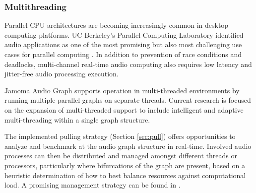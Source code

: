 \documentclass[twoside,a4paper]{article}
\begin{document}
%


\subsubsection{Multithreading} %

Parallel CPU architectures are becoming increasingly common in desktop computing platforms.
UC Berkeley's Parallel Computing Laboratory identified audio applications as one of the most promising but also most challenging use cases for parallel computing \cite{asanovic2008parallel}. 
In addition to prevention of race conditions and deadlocks, multi-channel real-time audio computing also requires low latency and jitter-free audio processing execution.

Jamoma Audio Graph supports operation in multi-threaded environments by running multiple parallel graphs on separate threads.  Current research is focused on the expansion of multi-threaded support to include intelligent and adaptive multi-threading within a single graph structure.  

The implemented pulling strategy (Section \ref{sec:pull}) offers opportunities to analyze and benchmark at the audio graph structure in real-time.  Involved audio processes can then be distributed and managed amongst different threads or processors, particularly where bifurcations of the graph are present, based on a heuristic determination of how to best balance resources against computational load.  A promising management strategy can be found in \cite{PartzschAES122}.



\end{document}
